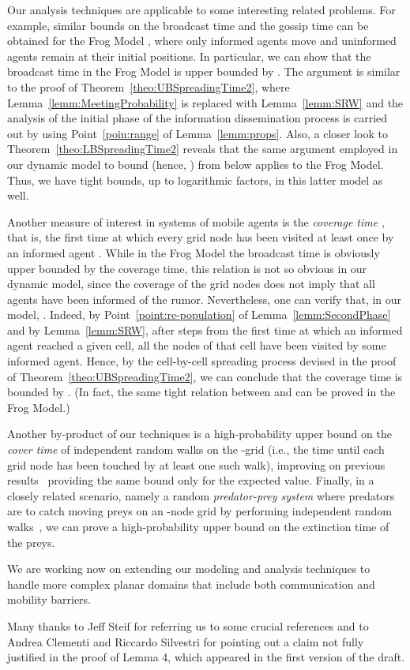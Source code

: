 \documentclass[11pt]{article}
\newcommand{\newterm}[1]{\emph{#1}}
\begin{document}
Our analysis techniques are applicable to some interesting related
problems.  For example, similar bounds on the broadcast time  and
the gossip time  can be obtained for the Frog Model
\cite{AlvesMP02}, where only informed agents move and uninformed
agents remain at their initial positions.  In particular, we can show
that the broadcast time in the Frog Model is upper bounded by .  The argument is similar to the proof of
Theorem~\ref{theo:UBSpreadingTime2}, where
Lemma~\ref{lemm:MeetingProbability} is replaced with
Lemma~\ref{lemm:SRW} and the analysis of the initial phase of the
information dissemination process is carried out by using
Point~\ref{poin:range} of Lemma~\ref{lemm:props}. Also, a closer look to
Theorem~\ref{theo:LBSpreadingTime2} reveals that the same argument
employed in our dynamic model to bound  (hence, ) from below 
applies to the Frog Model. Thus, we have tight bounds, up to
logarithmic factors, in this latter model as well.

Another measure of interest in systems of mobile agents is the
\newterm{coverage time} , that is, the first time at which every
grid node has been visited at least once by an informed agent
\cite{PeresSSS11}. While in the Frog Model the broadcast time is
obviously upper bounded by the coverage time, this relation is not so
obvious in our dynamic model, since the coverage of the grid nodes
does not imply that all agents have been informed of the rumor.
Nevertheless, one can verify that, in our model, .  Indeed, by Point~\ref{point:re-population} of
Lemma~\ref{lemm:SecondPhase} and by Lemma~\ref{lemm:SRW}, after
 steps from the first time at which an informed agent
reached a given cell, all the nodes of that cell have been visited by
some informed agent.  Hence, by the cell-by-cell spreading process
devised in the proof of Theorem~\ref{theo:UBSpreadingTime2}, we can
conclude that the coverage time is bounded by .
(In fact, the same tight relation between  and  can be
proved in the Frog Model.)

\sloppy Another by-product of our techniques is a high-probability upper bound
 on the
\newterm{cover time} of  independent random walks on the -grid
(i.e., the time until each grid node has been touched by at least one
such walk), improving on previous results~\cite{AlonAKKLT08,
  ElsasserS09} providing the same bound only for the expected
value. Finally, in a closely related scenario, namely a random
\newterm{predator-prey system} where  predators
are to catch moving preys on an -node grid by performing independent
random walks~\cite{CooperFR09}, we can prove a
high-probability upper bound  
on the extinction time of the preys.

We are working now on extending our modeling and analysis techniques
to handle more complex planar domains that include both communication
and mobility barriers.

Many thanks to Jeff Steif for referring us to some crucial
references and to Andrea Clementi and Riccardo Silvestri for
pointing out a claim not fully justified in the proof of Lemma 4,
which appeared in the first version of the draft.

{}


\end{document}
